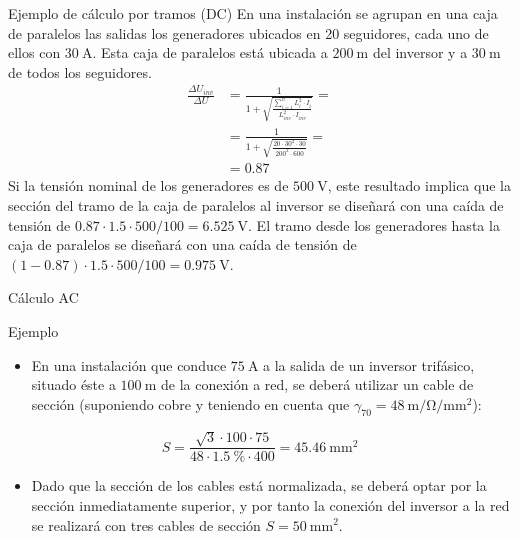 \documentclass[aspectratio=169, usenames,svgnames,dvipsnames]{beamer}
\begin{document}
\begin{frame}[label={sec:org9c623c1}]{Ejemplo de cálculo por tramos (DC)}
En una instalación se agrupan en una caja de paralelos las salidas los generadores ubicados en 20 seguidores, cada uno de ellos con \(\qty{30}{\ampere}\). Esta caja de paralelos está ubicada a \(\qty{200}{\meter}\) del inversor y a \(\qty{30}{\meter}\) de todos los seguidores.
\begin{align*}
  \frac{\Delta U_{inv}}{\Delta U} &= \frac{1}{1+\sqrt{\frac{\sum_{i=1}^nL_{i}^2
                                    \cdot I_{i}}{L_{inv}^2 \cdot I_{inv}}}} = \\
                                  &=\frac{1}{1 + \sqrt{\frac{20 \cdot 30^2 \cdot 30}{200^2 \cdot 600 }}} = \\
                                  &= \num{0.87}
\end{align*}
Si la tensión nominal de los generadores es de \(\qty{500}{\volt}\), este resultado implica que la sección del tramo de la caja de paralelos al inversor se diseñará con una caída de tensión de \(\num{0.87} \cdot \num{1.5} \cdot 500 /100 = \qty{6.525}{\volt}\). El tramo desde los generadores hasta la caja de paralelos se diseñará con una caída de tensión de \((1 - \num{0.87}) \cdot \num{1.5} \cdot 500 /100 = \qty{0.975}{\volt}\).
\end{frame}

\begin{frame}[label={sec:orgb7ac8b9}]{Cálculo AC}
\begin{block}{Ejemplo}
\begin{itemize}
\item En una instalación que conduce \(\qty{75}{\ampere}\) a la salida de un
inversor trifásico, situado éste a \(\qty{100}{\meter}\) de la conexión
a red, se deberá utilizar un cable de sección (suponiendo cobre y teniendo en cuenta
que \(\gamma_{70} = \qty{48}{\meter\per\ohm\per\milli\meter\squared}\)):
\end{itemize}


\[
  S=\frac{\sqrt{3} \cdot 100 \cdot 75}{48 \cdot \qty{1.5}{\percent}\cdot400}=\qty{45.46}{\milli\meter\squared}
\]

\begin{itemize}
\item Dado que la sección de los cables está normalizada, se deberá optar
por la sección inmediatamente superior, y por tanto la conexión del
inversor a la red se realizará con tres cables de sección
\(S=\qty{50}{\milli\meter\squared}\).
\end{itemize}
\end{block}
\end{frame}
\end{document}
